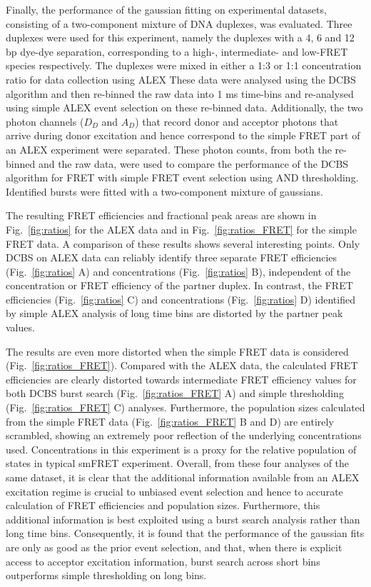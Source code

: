 Finally, the performance of the gaussian fitting on experimental datasets, consisting of a two-component mixture of DNA duplexes, was evaluated. Three duplexes were used for this experiment, namely the duplexes with a 4, 6 and 12 bp dye-dye separation, corresponding to a high-, intermediate- and low-FRET species respectively. The duplexes were mixed in either a 1:3 or 1:1 concentration ratio for data collection using ALEX  These data were analysed using the DCBS algorithm and then re-binned the raw data into 1 ms time-bins and re-analysed using simple ALEX event selection on these re-binned data. Additionally, the two photon channels ($D_D$ and $A_D$) that record donor and acceptor photons that arrive during donor excitation and hence correspond to the simple FRET part of an ALEX experiment were separated. These photon counts, from both the re-binned and the raw data, were used to compare the performance of the DCBS algorithm for FRET with simple FRET event selection using AND thresholding. Identified bursts were fitted with a two-component mixture of gaussians.

The resulting FRET efficiencies and fractional peak areas are shown in Fig.~\ref{fig:ratios} for the ALEX data and in Fig.~\ref{fig:ratios_FRET} for the simple FRET data. A comparison of these results shows several interesting points. Only DCBS on ALEX data can reliably identify three separate FRET efficiencies (Fig.~\ref{fig:ratios} A) and concentrations (Fig.~\ref{fig:ratios} B), independent of the concentration or FRET efficiency of the partner duplex. In contrast, the FRET efficiencies (Fig.~\ref{fig:ratios} C) and concentrations (Fig.~\ref{fig:ratios} D) identified by simple ALEX analysis of long time bins are distorted by the partner peak values.

The results are even more distorted when the simple FRET data is considered (Fig.~\ref{fig:ratios_FRET}). Compared with the ALEX data, the calculated FRET efficiencies are clearly distorted towards intermediate FRET efficiency values for both DCBS burst search (Fig.~\ref{fig:ratios_FRET} A) and simple thresholding (Fig.~\ref{fig:ratios_FRET} C) analyses. Furthermore, the population sizes calculated from the simple FRET data (Fig.~\ref{fig:ratios_FRET} B and D) are entirely scrambled, showing an extremely poor reflection of the underlying concentrations used. Concentrations in this experiment is a proxy for the relative population of states in typical smFRET experiment. Overall, from these four analyses of the same dataset, it is clear that the additional information available from an ALEX excitation regime is crucial to unbiased event selection and hence to accurate calculation of FRET efficiencies and population sizes. Furthermore, this additional information is best exploited using a burst search analysis rather than long time bins. Consequently, it is found that the performance of the gaussian fits are only as good as the prior event selection, and that, when there is explicit access to acceptor excitation information, burst search across short bins outperforms simple thresholding on long bins.

